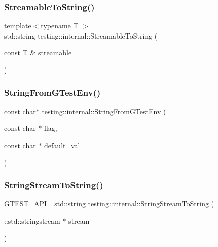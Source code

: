 \mbox{\label{namespacetesting_1_1internal_aad4beed95d0846e6ffc5da0978ef3bb9}} 
\subsubsection{\texorpdfstring{Streamable\+To\+String()}{StreamableToString()}}
{\footnotesize\ttfamily template$<$typename T $>$ \\
std\+::string testing\+::internal\+::\+Streamable\+To\+String (\begin{DoxyParamCaption}\item[{const T \&}]{streamable }\end{DoxyParamCaption})}

\mbox{\label{namespacetesting_1_1internal_a72099045bb72303860b2138658a5f6ee}} 
\subsubsection{\texorpdfstring{String\+From\+G\+Test\+Env()}{StringFromGTestEnv()}}
{\footnotesize\ttfamily const char$\ast$ testing\+::internal\+::\+String\+From\+G\+Test\+Env (\begin{DoxyParamCaption}\item[{const char $\ast$}]{flag,  }\item[{const char $\ast$}]{default\+\_\+val }\end{DoxyParamCaption})}

\mbox{\label{namespacetesting_1_1internal_a75bdbc38815772055696b2a40bae614e}} 
\subsubsection{\texorpdfstring{String\+Stream\+To\+String()}{StringStreamToString()}}
{\footnotesize\ttfamily \hyperlink{gtest-port_8h_aa73be6f0ba4a7456180a94904ce17790}{G\+T\+E\+S\+T\+\_\+\+A\+P\+I\+\_\+} std\+::string testing\+::internal\+::\+String\+Stream\+To\+String (\begin{DoxyParamCaption}\item[{\+::std\+::stringstream $\ast$}]{stream }\end{DoxyParamCaption})}

